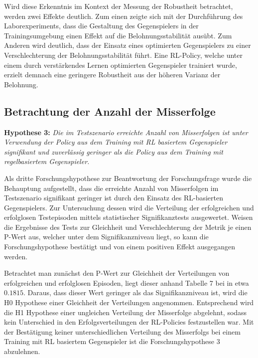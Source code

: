 Wird diese Erkenntnis im Kontext der Messung der Robustheit betrachtet, werden zwei Effekte deutlich.
Zum einen zeigte sich mit der Durchführung des Laborexperiments, dass die Gestaltung des Gegenspielers in der Trainingsumgebung einen Effekt auf die Belohnungsstabilität ausübt.
Zum Anderen wird deutlich, dass der Einsatz eines optimierten Gegenspielers zu einer Verschlechterung der Belohnungsstabilität führt.
Eine RL-Policy, welche unter einem durch verstärkendes Lernen optimierten Gegenspieler trainiert wurde, erzielt demnach eine geringere Robustheit aus der höheren Varianz der Belohnung. %

\subsection{Betrachtung der Anzahl der Misserfolge}

\textbf{Hypothese 3:}
\textit{Die im Testszenario erreichte Anzahl von Misserfolgen ist unter Verwendung der Policy aus dem Training mit RL basiertem Gegenspieler signifikant und zuverlässig geringer als die Policy aus dem Training mit regelbasiertem Gegenspieler.}

Als dritte Forschungshypothese zur Beantwortung der Forschungsfrage wurde die Behauptung aufgestellt, dass die erreichte Anzahl von Misserfolgen im Testszenario signifikant geringer ist durch den Einsatz des RL-basierten Gegenspielers.
Zur Untersuchung dessen wird die Verteilung der erfolgreichen und erfolglosen Testepisoden mittels statistischer Signifikanztests ausgewertet. 
Weisen die Ergebnisse des Tests zur Gleichheit und Verschlechterung der Metrik je einen P-Wert aus, welcher unter dem Signifikanzniveau liegt, so kann die Forschungshypothese bestätigt und von einem positiven Effekt ausgegangen werden.

Betrachtet man zunächst den P-Wert zur Gleichheit der Verteilungen von erfolgreichen und erfolglosen Episoden, liegt dieser anhand Tabelle 7 bei in etwa $0.1815$. %
Daraus, dass dieser Wert geringer als das Signifikanzniveau ist, wird die H0 Hypothese einer Gleichheit der Verteilungen angenommen. %
Entsprechend wird die H1 Hypothese einer ungleichen Verteilung der Misserfolge abgelehnt, sodass kein Unterschied in den Erfolgsverteilungen der RL-Policies festzustellen war.
Mit der Bestätigung keiner unterschiedlichen Verteilung des Misserfolgs bei einem Training mit RL basiertem Gegenspieler ist die Forschungshypothese 3 abzulehnen.

